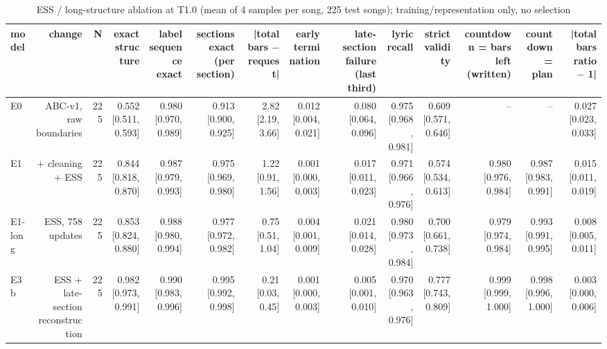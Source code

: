 \begin{table}[t]
\centering
\small
\begin{tabular}{lrrrrrrrrrrrrr}
\toprule
model & change & N & exact structure & label sequence exact & sections exact (per section) & |total bars $-$ request| & early termination & late-section failure (last third) & lyric recall & strict validity & countdown = bars left (written) & countdown = plan & |total bars ratio $-$ 1| \\
\midrule
E0 & ABC-v1, raw boundaries & 225 & 0.552 [0.511, 0.593] & 0.980 [0.970, 0.989] & 0.913 [0.900, 0.925] & 2.82 [2.19, 3.66] & 0.012 [0.004, 0.021] & 0.080 [0.064, 0.096] & 0.975 [0.968, 0.981] & 0.609 [0.571, 0.646] & – & – & 0.027 [0.023, 0.033] \\
E1 & + cleaning + ESS & 225 & 0.844 [0.818, 0.870] & 0.987 [0.979, 0.993] & 0.975 [0.969, 0.980] & 1.22 [0.91, 1.56] & 0.001 [0.000, 0.003] & 0.017 [0.011, 0.023] & 0.971 [0.966, 0.976] & 0.574 [0.534, 0.613] & 0.980 [0.976, 0.984] & 0.987 [0.983, 0.991] & 0.015 [0.011, 0.019] \\
E1-long & ESS, 758 updates & 225 & 0.853 [0.824, 0.880] & 0.988 [0.980, 0.994] & 0.977 [0.972, 0.982] & 0.75 [0.51, 1.04] & 0.004 [0.001, 0.009] & 0.021 [0.014, 0.028] & 0.980 [0.973, 0.984] & 0.700 [0.661, 0.738] & 0.979 [0.974, 0.984] & 0.993 [0.991, 0.995] & 0.008 [0.005, 0.011] \\
E3b & ESS + late-section reconstruction & 225 & 0.982 [0.973, 0.991] & 0.990 [0.983, 0.996] & 0.995 [0.992, 0.998] & 0.21 [0.03, 0.45] & 0.001 [0.000, 0.003] & 0.005 [0.001, 0.010] & 0.970 [0.963, 0.976] & 0.777 [0.743, 0.809] & 0.999 [0.999, 1.000] & 0.998 [0.996, 1.000] & 0.003 [0.000, 0.006] \\
\bottomrule
\end{tabular}
\caption{ESS / long-structure ablation at T1.0 (mean of 4 samples per song, 225 test songs); training/representation only, no selection}
\label{tab:ess_ablation_T10}
\end{table}
